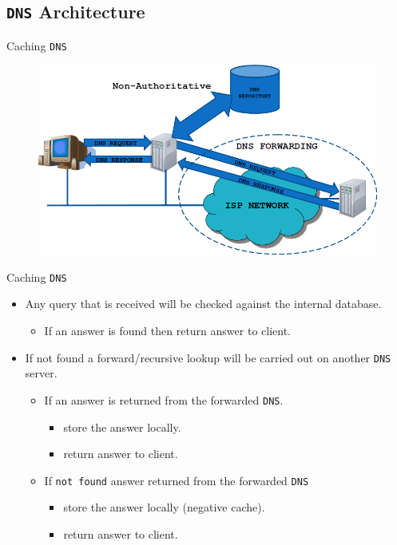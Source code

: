 \documentclass{beamer}
\begin{document}
\subsection{\texttt{DNS} Architecture}

\begin{frame}{Caching \texttt{DNS}}
  \begin{figure}
    \begin{center}
      \includegraphics[width=1\linewidth]{cachingdns.png}
    \end{center}
  \end{figure}
\end{frame}

\begin{frame}{Caching \texttt{DNS}}
  \begin{itemize}
    \item Any query that is received will be checked against the internal database.
      \begin{itemize}
        \item If an answer is found then return answer to client.
      \end{itemize}
    \item If not found a forward/recursive lookup will be carried out on another \texttt{DNS} server.
      \begin{itemize}
        \item If an answer is returned from the forwarded \texttt{DNS}.
          \begin{itemize}
            \item store the answer locally.
            \item return answer to client.
          \end{itemize}
        \item If \texttt{not found} answer returned from the forwarded \texttt{DNS}
        \begin{itemize}
          \item store the answer locally (negative cache).
          \item return answer to client.
        \end{itemize}
      \end{itemize}
  \end{itemize} 
\end{frame}
\end{document}
